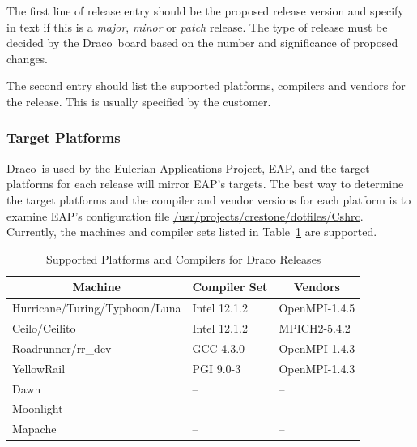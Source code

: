 \documentclass[note]{newmemo}
\newcommand{\draco}{{\normalfont\small\sffamily Draco}}
\begin{document}
The first line of release entry should be the proposed release version
and specify in text if this is a {\it major}, {\it minor} or {\it
  patch} release.  The type of release must be decided by the
\draco\ board based on the number and significance of proposed
changes.

The second entry should list the supported platforms, compilers and
vendors for the release.  This is usually specified by the customer.


\subsubsection{Target Platforms}
\label{sec:target_platforms}

\draco\ is used by the Eulerian Applications Project, EAP, and the
target platforms for each release will mirror EAP's targets.  The best
way to determine the target platforms and the compiler and vendor
versions for each platform is to examine EAP's configuration file
\url{/usr/projects/crestone/dotfiles/Cshrc}.  Currently, the machines
and compiler sets listed in Table~\ref{tab:supported_platforms} are
supported.
%
\begin{table}[ht]
  \caption{Supported Platforms and Compilers for Draco Releases}
  \label{tab:supported_platforms}
\begin{center}
\begin{tabular}{lll} \hline\hline
\multicolumn{1}{c}{Machine} & 
\multicolumn{1}{c}{Compiler Set} & 
\multicolumn{1}{c}{Vendors} \\ \hline
Hurricane/Turing/Typhoon/Luna & Intel 12.1.2 &  OpenMPI-1.4.5 \\
Ceilo/Ceilito         & Intel 12.1.2     &  MPICH2-5.4.2 \\
Roadrunner/rr\_dev    & GCC 4.3.0      &  OpenMPI-1.4.3 \\
YellowRail            & PGI 9.0-3      &  OpenMPI-1.4.3 \\
Dawn                  & --             &  --             \\
Moonlight             & --             & --             \\
Mapache               & --             & --             \\
\hline\hline
\end{tabular}
\end{center}
\end{table}
\end{document}

